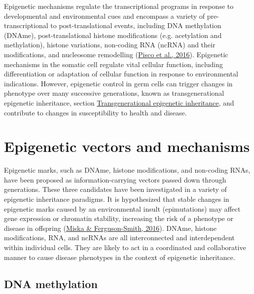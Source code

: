 \documentclass[12pt,twoside]{reedthesis}
\begin{document}
Epigenetic mechanisms regulate the transcriptional programs in response
to developmental and environmental cues and encompass a variety of
pre-transcriptional to post-translational events, including DNA
methylation (DNAme), post-translational histone modifications (e.g.
acetylation and methylation), histone variations, non-coding RNA (ncRNA)
and their modifications, and nucleosome remodelling (\protect\hyperlink{ref-pisco2016}{Pisco et al., 2016}).
Epigenetic mechanisms in the somatic cell regulate vital cellular
function, including differentiation or adaptation of cellular function
in response to environmental indications. However, epigenetic control in
germ cells can trigger changes in phenotype over many successive
generations, known as transgenerational epigenetic inheritance, section
\protect\hyperlink{tei}{Transgenerational epigenetic inheritance}, and contribute to
changes in susceptibility to health and disease.

\hypertarget{epigenetic-vectors-and-mechanisms}{%
\section*{Epigenetic vectors and mechanisms}\label{epigenetic-vectors-and-mechanisms}}

Epigenetic marks, such as DNAme, histone modifications, and non-coding
RNAs, have been proposed as information-carrying vectors passed down
through generations. These three candidates have been investigated in a
variety of epigenetic inheritance paradigms. It is hypothesized that
stable changes in epigenetic marks caused by an environmental insult
(epimutations) may affect gene expression or chromatin stability,
increasing the risk of a phenotype or disease in offspring (\protect\hyperlink{ref-miska2016}{Miska \& Ferguson-Smith, 2016}).
DNAme, histone modifications, RNA, and ncRNAs are all interconnected and
interdependent within individual cells. They are likely to act in a
coordinated and collaborative manner to cause disease phenotypes in the
context of epigenetic inheritance.

\hypertarget{dna-methylation}{%
\subsection*{DNA methylation}\label{dna-methylation}}
\end{document}
